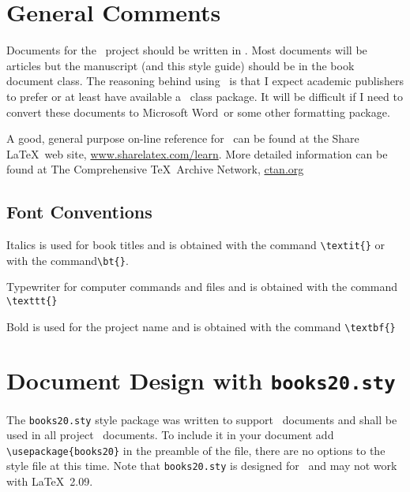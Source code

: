 
\section{General Comments}

Documents for the \ProjectTitle\ project should be written in
\LaTeXe. Most documents will be articles but the manuscript (and this
style guide) should be in the book document class. The reasoning
behind using \LaTeXe\ is that I expect academic publishers to prefer
or at least have available a \LaTeXe\ class package.  It will be
difficult if I need to convert these documents to Microsoft
Word\texttrademark\ or some other formatting package.

A good, general purpose on-line reference for \LaTeXe\ can be found at
the Share \LaTeX\ web site,
\href{http://www.sharelatex.com/learn}{www.sharelatex.com/learn}.
More detailed information can be found at The Comprehensive
\TeX\ Archive Network, \href{ctan.org}{ctan.org}

\subsection{Font Conventions}

Italics is used for book titles and is obtained with the command
\verb|\textit{}| or with the command\verb|\bt{}|.

Typewriter for computer commands and files and is obtained with the
command \verb|\texttt{}|

Bold is used for the project name and is obtained with the command
\verb|\textbf{}|

\section{Document Design with \texttt{books20.sty}}

The \texttt{books20.sty} style package was written to support
\ProjectTitle\ documents and shall be used in all project
\LaTeXe\ documents. To include it in your document add
\verb|\usepackage{books20}| in the preamble of the file, there are no
options to the style file at this time. Note that \texttt{books20.sty}
is designed for \LaTeXe\ and may not work with \LaTeX\ 2.09.


